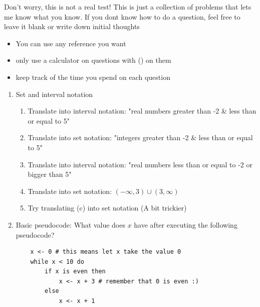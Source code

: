 \documentclass[12pt]{article}
\begin{document}
Don't worry, this is not a real test! This is just a collection of problems that lets me know what you know. If you dont know how to do a question, feel free to leave it blank or write down initial thoughts
\begin{itemize}
    \item You can use any reference you want
    \item only use a calculator on questions with (\faCalculator)  on them
    \item keep track of the time you spend on each question
\end{itemize}

\hrulefill

\begin{enumerate}
    \item Set and interval notation 
    \begin{enumerate}
        \item Translate into interval notation: "real numbers greater than -2 \& less than or equal to 5"
        \vspace{1cm}
        \item Translate into set notation: "integers greater than -2 \& less than or equal to 5"
        \vspace{1cm}
        \item Translate into interval notation: "real numbers {less than or equal to} -2 or {bigger than} 5"
        \vspace{1cm}
        \item Translate into set notation: $(-\infty, 3) \cup (3, \infty)$
        \vspace{1cm}
        \item Try translating (c) into set notation (A bit trickier)
        \vspace{1cm}
    \end{enumerate}

    \item Basic pseudocode: What value does $x$ have after executing the following pseudocode?
    \begin{verbatim}
    x <- 0 # this means let x take the value 0
    while x < 10 do
        if x is even then
            x <- x + 3 # remember that 0 is even :)
        else
            x <- x + 1
    \end{verbatim}
    \newpage


\end{enumerate}
\end{document}

